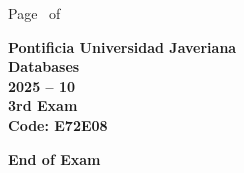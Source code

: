 \documentclass[11pt, addpoints, answers]{exam}\usepackage[utf8]{inputenc}
\begin{document}
\begin{coverpages}
\begin{center}
			\vspace{3mm}
			\leavevmode \hspace{5mm} 
		\end{center}
	\end{coverpages}

	\footer{} {Page \thepage\ of \numpages} {}

	\centering
	\textbf{\Large Pontificia Universidad Javeriana}\\
	\textbf{\Large Databases} \\
	\textbf{\large 2025 -- 10} \\
	\textbf{\large 3rd Exam} \\
	\textbf{Code: E72E08}


	\begin{questions}
		
		
		
		
		
		
		
		
		
		
		
		
		
		
		
		
		
		
		
		
	\end{questions}

	\vspace{5mm}
	\noindent \textbf{End of Exam}
\end{document}
